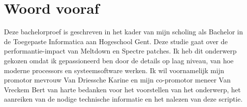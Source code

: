 
\chapter*{Woord vooraf}
\label{ch:voorwoord}


Deze bachelorproef is geschreven in het kader van mijn scholing als Bachelor in de Toegepaste
Informatica aan Hogeschool Gent. Deze studie gaat over de performantie-impact van Meltdown en Spectre patches. Ik heb dit onderwerp gekozen omdat ik gepassioneerd ben door de details op laag niveau, van hoe moderne processors en systeemsoftware werken.
Ik wil voornamelijk mijn promotor mevrouw Van Driessche Karine en mijn co-promotor meneer Van Vreckem Bert van harte bedanken voor het voorstellen van het onderwerp, het aanreiken van de nodige technische informatie en het nalezen van deze scriptie.